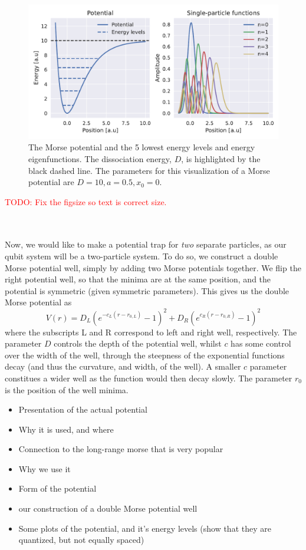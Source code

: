 \documentclass{subfiles}
\begin{document}
\begin{figure}
    \centering
    \includegraphics[width=1.0\textwidth]{figs/potential_spf.pdf}
    \caption{The Morse potential and the 5 lowest energy levels and energy eigenfunctions. The dissociation energy, $D$, is highlighted by the black dashed line. The parameters for this visualization of a Morse potential are $D=10, a=0.5, x_0=0$.}
    \label{fig:morse_potential}
\end{figure}
\textcolor{red}{TODO: Fix the figsize so text is correct size.}

\\ \\
Now, we would like to make a potential trap for \emph{two} separate particles, as our qubit system will be a two-particle system. To do so, we construct a double Morse potential well, simply by adding two Morse potentials together. We flip the right potential well, so that the minima are at the same position, and the potential is symmetric (given symmetric parameters). This gives us the double Morse potential as
\begin{equation}
    V(r) = D_L(e^{-c_L(r-r_{0,L})} - 1)^2 + D_R(e^{c_R(r-r_{0,R})} - 1)^2\label{eq:double_well_morse_potential}
\end{equation}
where the subscripts L and R correspond to left and right well, respectively. The parameter $D$ controls the depth of the potential well, whilst $c$ has some control over the width of the well, through the steepness of the exponential functions decay (and thus the curvature, and width, of the well). A smaller $c$ parameter constitues a wider well as the function would then decay slowly. The parameter $r_0$ is the position of the well minima. 

\begin{itemize}
    \item Presentation of the actual potential
    \item Why it is used, and where
    \item Connection to the long-range morse that is very popular
    \item Why we use it
    \item Form of the potential
    \item our construction of a double Morse potential well
    \item Some plots of the potential, and it's energy levels (show that they are quantized, but not equally spaced)
\end{itemize}
\end{document}
